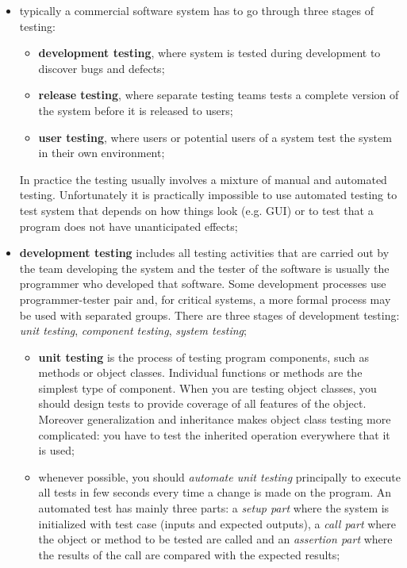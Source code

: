 \documentclass[oneside]{article}
\begin{document}
\begin{itemize}
    \item typically a commercial software system has to go through three stages of testing:
        \begin{itemize}
            \item \textbf{development testing}, where system is tested during development to discover bugs and defects;
            \item \textbf{release testing}, where separate testing teams tests a complete version of the system before it is released to users;
            \item \textbf{user testing}, where users or potential users of a system test the system in their own environment;
        \end{itemize}
    In practice the testing usually involves a mixture of manual and automated testing. Unfortunately it is practically impossible to use automated testing to test system that depends on how things look (e.g. GUI) or to test that a program does not have unanticipated effects;
    
    \item \textbf{development testing} includes all testing activities that are carried out by the team developing the system and the tester of the software is usually the programmer who developed that software. Some development processes use programmer-tester pair and, for critical systems, a more formal process may be used with separated groups. There are three stages of development testing: \textit{unit testing}, \textit{component testing}, \textit{system testing};
        \begin{itemize}
        \item \textbf{unit testing} is the process of testing program components, such as methods or object classes. Individual functions or methods are the simplest type of component. When you are testing object classes, you should design tests to provide coverage of all features of the object. Moreover generalization and inheritance makes object class testing more complicated: you have to test the inherited operation everywhere that it is used;
        
        \item whenever possible, you should \textit{automate unit testing} principally to execute all tests in few seconds every time a change is made on the program. An automated test has mainly three parts: a \textit{setup part} where the system is initialized with test case (inputs and expected outputs), a \textit{call part} where the object or method to be tested are called and an \textit{assertion part} where the results of the call are compared with the expected results;
        

\end{itemize}
\end{itemize}
\end{document}
